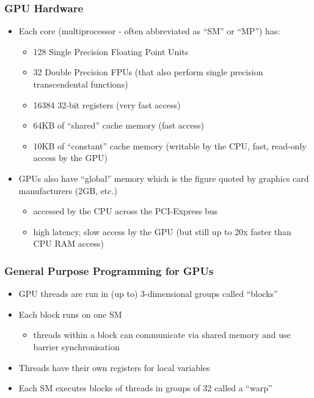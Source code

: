\subsubsection{GPU Hardware}\label{gpu-hardware}

\begin{itemize}
\itemsep1pt\parskip0pt
\item
  Each core (multiprocessor - often abbreviated as ``SM'' or ``MP'')
  has:

  \begin{itemize}
  \itemsep1pt\parskip0pt
  \item
    128 Single Precision Floating Point Units
  \item
    32 Double Precision FPUs (that also perform single precision
    transcendental functions)
  \item
    16384 32-bit registers (very fast access)
  \item
    64KB of ``shared'' cache memory (fast access)
  \item
    10KB of ``constant'' cache memory (writable by the CPU, fast,
    read-only access by the GPU)
  \end{itemize}
\item
  GPUs also have ``global'' memory which is the figure quoted by
  graphics card manufacturers (2GB, etc.)

  \begin{itemize}
  \itemsep1pt\parskip0pt
  \item
    accessed by the CPU across the PCI-Express bus
  \item
    high latency, slow access by the GPU (but still up to 20x faster
    than CPU RAM access)
  \end{itemize}
\end{itemize}

\subsubsection{General Purpose Programming for
GPUs}\label{general-purpose-programming-for-gpus}

\begin{itemize}
\itemsep1pt\parskip0pt
\item
  GPU threads are run in (up to) 3-dimensional groups called ``blocks''
\item
  Each block runs on one SM

  \begin{itemize}
  \itemsep1pt\parskip0pt
  \item
    threads within a block can communicate via shared memory and use
    barrier synchronisation
  \end{itemize}
\item
  Threads have their own registers for local variables
\item
  Each SM executes blocks of threads in groups of 32 called a ``warp''
\end{itemize}

